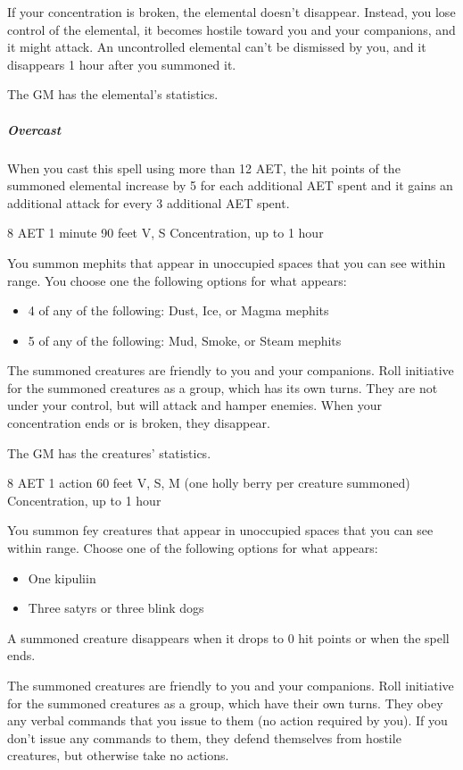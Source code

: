 If your concentration is broken, the elemental doesn't disappear. Instead, you lose control of the elemental, it becomes hostile toward you and your companions, and it might attack. An uncontrolled elemental can't be dismissed by you, and it disappears 1 hour after you summoned it.

The GM has the elemental's statistics.

\subparagraph*{Overcast} When you cast this spell using more than 12 AET, the hit points of the summoned elemental increase by 5 for each additional AET spent and it gains an additional attack for every 3 additional AET spent.


{8 AET}
{1 minute}
{90 feet}
{V, S}
{Concentration, up to 1 hour}

You summon mephits that appear in unoccupied spaces that you can see within range. You choose one the following options for what appears:
\begin{itemize}
\item 4 of any of the following: Dust, Ice, or Magma mephits
\item 5 of any of the following: Mud, Smoke, or Steam mephits
\end{itemize}

The summoned creatures are friendly to you and your companions. Roll initiative for the summoned creatures as a group, which has its own turns. They are not under your control, but will attack and hamper enemies. When your concentration ends or is broken, they disappear.

The GM has the creatures' statistics.


{8 AET}
{1 action}
{60 feet}
{V, S, M (one holly berry per creature summoned)}
{Concentration, up to 1 hour}

You summon fey creatures that appear in unoccupied spaces that you can see within range. Choose one of the following options for what appears:

\begin{itemize}
\item One kipuliin
\item Three satyrs or three blink dogs
\end{itemize}

A summoned creature disappears when it drops to 0 hit points or when the spell ends.

The summoned creatures are friendly to you and your companions. Roll initiative for the summoned creatures as a group, which have their own turns. They obey any verbal commands that you issue to them (no action required by you). If you don't issue any commands to them, they defend themselves from hostile creatures, but otherwise take no actions.

